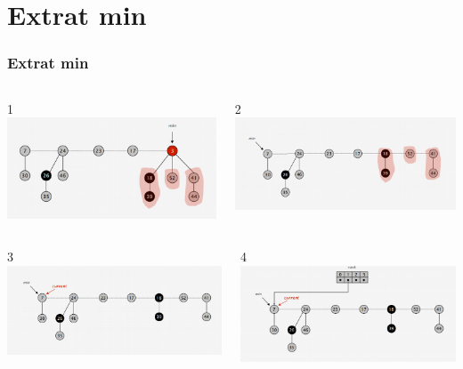 \documentclass{beamer}
\begin{document}
\section{Extrat min}
\begin{frame}
 \frametitle{Extrat min}
 \begin{columns}[t]
 1
    \includegraphics[width =0.9 \textwidth]{imagenes/delete1.png}
      
    2
    \includegraphics[width =0.9 \textwidth]{imagenes/delete2.png}

   \end{columns}
   \begin{columns}[t]
   3
    \includegraphics[width =0.9 \textwidth]{imagenes/delete3.png}
      
    4
    \includegraphics[width =0.9 \textwidth]{imagenes/delete4.png}

   \end{columns}
\end{frame}
\end{document}
